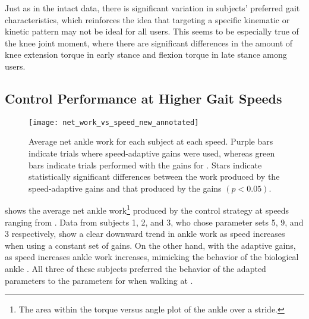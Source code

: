 Just as in the intact data, there is significant variation in subjects'
preferred gait characteristics, which reinforces the idea that targeting a
specific kinematic or kinetic pattern may not be ideal for all users. This seems
to be especially true of the knee joint moment, where there are significant
differences in the amount of knee extension torque in early stance and flexion
torque in late stance among users. 

\begin{comment}
We found that most subjects produced relatively little ankle dorsiflexion as
they walked. Consequently, for most subjects, the neuromuscular model control
produced less ankle plantarflexion torque than is the average for able-bodied
subjects.  We believe the low level of ankle dorsiflexion was caused by the
relatively short foot of the prosthesis, which we plan to rectify for future
experiments. However, this effect also betrays a potential weakness of the
approach: optimizing to match able-bodied kinetics given able-bodied kinematics
may not be able to rectify some types of discrepancies between the human and the
prosthesis.
\end{comment}

\subsection{Control Performance at Higher Gait Speeds}
\begin{figure}
    \centering
    \texttt{[image: net\_work\_vs\_speed\_new\_annotated]}
    \caption[Average net ankle work for each subject at each speed]{Average net
    ankle work for each subject at each speed. Purple bars indicate trials where
    speed-adaptive gains were used, whereas green bars indicate trials performed
    with the gains for . Stars indicate statistically
    significant differences between the work produced by the speed-adaptive
    gains and that produced by the  gains $(p <
    0.05)$.}\label{fig:net_work_vs_speed}
\end{figure}

 shows the average net ankle work\footnote{The area
within the torque versus angle plot of the ankle over a stride.} produced by the
control strategy at speeds ranging from . Data from
subjects 1, 2, and 3, who chose parameter sets 5, 9, and 3 respectively, show a
clear downward trend in ankle work as speed increases when using a constant set
of gains. On the other hand, with the adaptive gains, as speed increases ankle
work increases, mimicking the behavior of the biological ankle
\citep{herr2012bionic}. All three of these subjects preferred the behavior of
the adapted parameters to the parameters for  when walking
at .

